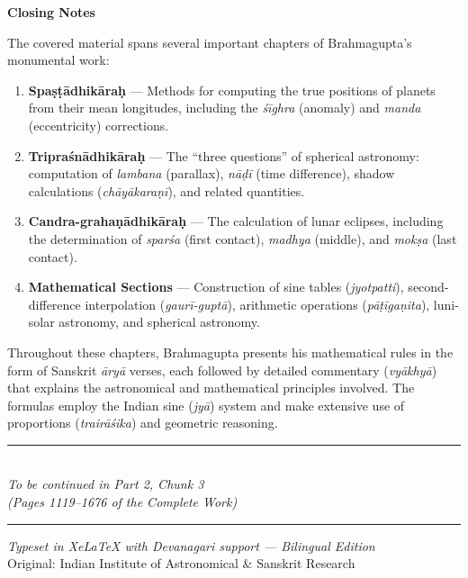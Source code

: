 \documentclass[11pt,a4paper]{article}
\newcommand{\shortline}{\noindent\rule{0.5\textwidth}{0.4pt}\par}
\begin{document}
\begin{minipage}[t]{0.48\textwidth}
\small
\textbf{Closing Notes}

The covered material spans several important chapters of Brahmagupta's monumental work:

\begin{enumerate}[nosep]
\item \textbf{Spa\d{s}\d{t}\=adhik\=ara\d{h}} --- Methods for computing the true positions of planets from their mean longitudes, including the \textit{\'s\=ighra} (anomaly) and \textit{manda} (eccentricity) corrections.

\item \textbf{Tripra\'sn\=adhik\=ara\d{h}} --- The ``three questions'' of spherical astronomy: computation of \textit{lambana} (parallax), \textit{n\=a\d{d}\=i} (time difference), shadow calculations (\textit{ch\=ay\=akara\d{n}\=i}), and related quantities.

\item \textbf{Candra-graha\d{n}\=adhik\=ara\d{h}} --- The calculation of lunar eclipses, including the determination of \textit{spar\'sa} (first contact), \textit{madhya} (middle), and \textit{mok\d{s}a} (last contact).

\item \textbf{Mathematical Sections} --- Construction of sine tables (\textit{jyotpatti}), second-difference interpolation (\textit{gaur\=i-gupt\=a}), arithmetic operations (\textit{p\=a\d{t}\=iga\d{n}ita}), luni-solar astronomy, and spherical astronomy.
\end{enumerate}

Throughout these chapters, Brahmagupta presents his mathematical rules in the form of Sanskrit \textit{\=ary\=a} verses, each followed by detailed commentary (\textit{vy\=akhy\=a}) that explains the astronomical and mathematical principles involved. The formulas employ the Indian sine (\textit{jy\=a}) system and make extensive use of proportions (\textit{trair\=a\'sika}) and geometric reasoning.
\end{minipage}

\vspace{1.5cm}

\begin{center}
\shortline\\[0.5cm]
\textit{To be continued in Part 2, Chunk 3}\\
\textit{(Pages 1119--1676 of the Complete Work)}\\[0.5cm]
\shortline
\end{center}

\vfill

\begin{center}
{\small\textit{Typeset in XeLaTeX with Devanagari support --- Bilingual Edition}}\\[0.3cm]
{\small Original: Indian Institute of Astronomical \& Sanskrit Research}
\end{center}
\end{document}
